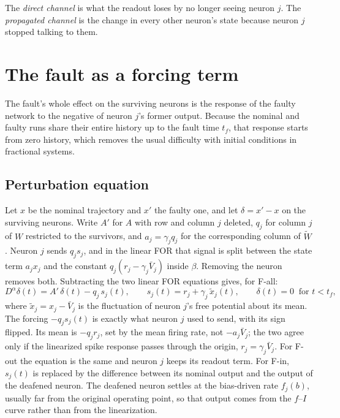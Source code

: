 \documentclass[11pt,a4paper]{article}
\newcommand{\Wt}{\tilde W}
\newcommand{\xtil}{\tilde x}
\begin{document}
The \emph{direct channel} is what the readout loses by no longer seeing neuron $j$. The \emph{propagated channel} is the change in every other neuron's state because neuron $j$ stopped talking to them.

\section{The fault as a forcing term}

The fault's whole effect on the surviving neurons is the response of the faulty network to the negative of neuron $j$'s former output. Because the nominal and faulty runs share their entire history up to the fault time $t_f$, that response starts from zero history, which removes the usual difficulty with initial conditions in fractional systems.

\subsection{Perturbation equation}

Let $x$ be the nominal trajectory and $x'$ the faulty one, and let $\delta = x' - x$ on the surviving neurons. Write $A'$ for $A$ with row and column $j$ deleted, $q_j$ for column $j$ of $W$ restricted to the survivors, and $a_j = \gamma_j q_j$ for the corresponding column of $\Wt$. Neuron $j$ sends $q_j s_{j}$, and in the linear FOR that signal is split between the state term $a_j x_j$ and the constant $q_j (r_j - \gamma_j \bar V_j)$ inside $\beta$. Removing the neuron removes both. Subtracting the two linear FOR equations gives, for F-all:
\begin{equation}
D^{\alpha}\delta(t) = A'\,\delta(t) - q_j\, s_j(t), \qquad s_j(t) = r_j + \gamma_j\, \xtil_j(t), \qquad \delta(t) = 0 \ \text{ for } t < t_f,
\label{eq:pert}
\end{equation}
where $\xtil_j = x_j - \bar V_j$ is the fluctuation of neuron $j$'s free potential about its mean. The forcing $-q_j s_j(t)$ is exactly what neuron $j$ used to send, with its sign flipped. Its mean is $-q_j r_j$, set by the mean firing rate, not $-a_j \bar V_j$; the two agree only if the linearized spike response passes through the origin, $r_j = \gamma_j \bar V_j$. For F-out the equation is the same and neuron $j$ keeps its readout term. For F-in, $s_j(t)$ is replaced by the difference between its nominal output and the output of the deafened neuron. The deafened neuron settles at the bias-driven rate $f_j(b)$, usually far from the original operating point, so that output comes from the $f$--$I$ curve rather than from the linearization.
\end{document}
